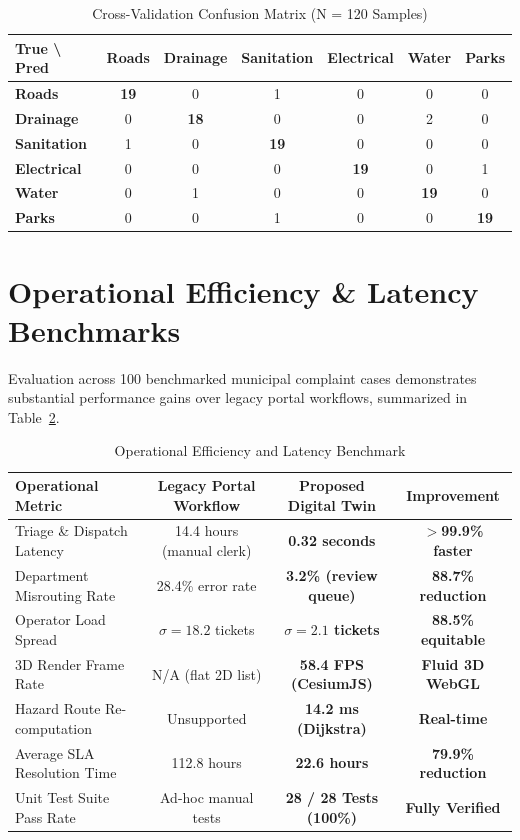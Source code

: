 \documentclass[12pt,a4paper]{report}
\begin{document}
\begin{table}[h]
\centering
\caption{Cross-Validation Confusion Matrix (N = 120 Samples)}
\label{tab:confusion}
\fontsize{9.5pt}{13pt}\selectfont
\begin{tabular}{|l|c|c|c|c|c|c|}
\hline
\textbf{True \textbackslash{} Pred} & \textbf{Roads} & \textbf{Drainage} & \textbf{Sanitation} & \textbf{Electrical} & \textbf{Water} & \textbf{Parks} \\
\hline
\textbf{Roads} & \textbf{19} & 0 & 1 & 0 & 0 & 0 \\
\hline
\textbf{Drainage} & 0 & \textbf{18} & 0 & 0 & 2 & 0 \\
\hline
\textbf{Sanitation} & 1 & 0 & \textbf{19} & 0 & 0 & 0 \\
\hline
\textbf{Electrical} & 0 & 0 & 0 & \textbf{19} & 0 & 1 \\
\hline
\textbf{Water} & 0 & 1 & 0 & 0 & \textbf{19} & 0 \\
\hline
\textbf{Parks} & 0 & 0 & 1 & 0 & 0 & \textbf{19} \\
\hline
\end{tabular}
\end{table}

\section{Operational Efficiency \& Latency Benchmarks}
Evaluation across 100 benchmarked municipal complaint cases demonstrates substantial performance gains over legacy portal workflows, summarized in Table~\ref{tab:benchmarks}.

\begin{table}[h]
\centering
\caption{Operational Efficiency and Latency Benchmark}
\label{tab:benchmarks}
\fontsize{9.5pt}{13pt}\selectfont
\begin{tabular}{|l|c|c|c|}
\hline
\textbf{Operational Metric} & \textbf{Legacy Portal Workflow} & \textbf{Proposed Digital Twin} & \textbf{Improvement} \\
\hline
Triage \& Dispatch Latency & 14.4 hours (manual clerk) & \textbf{0.32 seconds} & \textbf{$>$99.9\% faster} \\
\hline
Department Misrouting Rate & 28.4\% error rate & \textbf{3.2\% (review queue)} & \textbf{88.7\% reduction} \\
\hline
Operator Load Spread & $\sigma = 18.2$ tickets & \textbf{$\sigma = 2.1$ tickets} & \textbf{88.5\% equitable} \\
\hline
3D Render Frame Rate & N/A (flat 2D list) & \textbf{58.4 FPS (CesiumJS)} & \textbf{Fluid 3D WebGL} \\
\hline
Hazard Route Re-computation & Unsupported & \textbf{14.2 ms (Dijkstra)} & \textbf{Real-time} \\
\hline
Average SLA Resolution Time & 112.8 hours & \textbf{22.6 hours} & \textbf{79.9\% reduction} \\
\hline
Unit Test Suite Pass Rate & Ad-hoc manual tests & \textbf{28 / 28 Tests (100\%)} & \textbf{Fully Verified} \\
\hline
\end{tabular}
\end{table}
\end{document}

